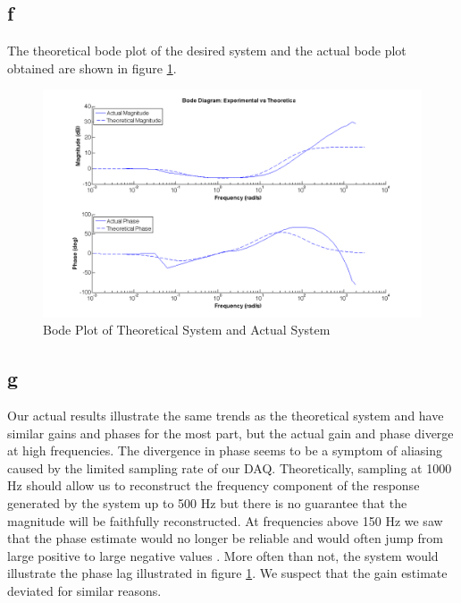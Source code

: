 \documentclass{article}
\theoremstyle{plain}
\theoremstyle{definition}
\theoremstyle{remark}
\begin{document}
\subsection*{f}
The theoretical bode plot of the desired system and the actual bode plot obtained are shown in figure \ref{q1_ff}.
\begin{figure}[hbt]
\begin{center}
\includegraphics[width = 17cm]{bodeplot.png}
\caption{Bode Plot of Theoretical System and Actual System}
\label{q1_ff}
\end{center}
\end{figure}

\subsection*{g}
Our actual results illustrate the same trends as the theoretical system and have similar gains and phases for the most part, but the actual gain and phase diverge at high frequencies.  The divergence in phase seems to be a symptom of aliasing caused by the limited sampling rate of our DAQ.  Theoretically, sampling at 1000 Hz should allow us to reconstruct the frequency component of the response generated by the system up to 500 Hz but there is no guarantee that the magnitude will be faithfully reconstructed.  At frequencies above 150 Hz we saw that the phase estimate would no longer be reliable and would often jump from large positive to large negative values .  More often than not, the system would illustrate the phase lag illustrated in figure \ref{q1_ff}.  We suspect that the gain estimate deviated for similar reasons.
\end{document}
